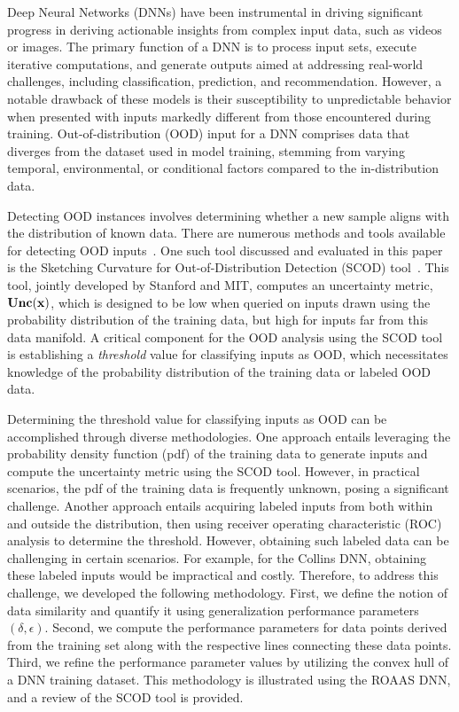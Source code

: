 \newtheorem{definition}{Definition}
Deep Neural Networks (DNNs) have been instrumental in driving significant progress in deriving actionable insights from complex input data, such as videos or images. The primary function of a DNN is to process input sets, execute iterative computations, and generate outputs aimed at addressing real-world challenges, including classification, prediction, and recommendation. However, a notable drawback of these models is their susceptibility to unpredictable behavior when presented with inputs markedly different from those encountered during training. Out-of-distribution (OOD) input for a DNN comprises data that diverges from the dataset used in model training, stemming from varying temporal, environmental, or conditional factors compared to the in-distribution data.

Detecting OOD instances involves determining whether a new sample
aligns with the distribution of known data. 
There are numerous methods and tools available for detecting OOD inputs~\cite{hendrycks2016baseline,ritter2018scalable,abdelzad2019detecting,madras2019detecting}. One such tool discussed and evaluated in this paper is the Sketching Curvature for Out-of-Distribution Detection (SCOD) tool~\cite{sharma2021sketching}. This tool, jointly developed by Stanford and MIT, computes an uncertainty metric, $\bf{Unc}(x)$, which is designed to be low when queried on inputs drawn using the probability distribution of the training data, but high for inputs far from this data manifold. A critical component for the OOD analysis using the SCOD tool is establishing a \emph{threshold} value for classifying inputs as OOD, which necessitates knowledge of the probability distribution of the training data or labeled OOD data.  

Determining the threshold value for classifying inputs as OOD can be accomplished through diverse methodologies. One approach entails leveraging the probability density function (pdf) of the training data to generate inputs and compute the uncertainty metric using the SCOD tool. However, in practical scenarios, the pdf of the training data is frequently unknown, posing a significant challenge. Another approach entails acquiring labeled inputs from both within and outside the distribution, then using receiver operating characteristic (ROC) analysis to determine the threshold. However, obtaining such labeled data can be challenging in certain scenarios. For example, for the Collins DNN, obtaining these labeled inputs would be impractical and costly. Therefore, to address this challenge, we developed the following methodology. First, we define the notion of data similarity and quantify it using generalization performance parameters $(\delta,\epsilon)$. Second, we compute the performance parameters for data points derived from the training set along with the respective lines connecting these data points. Third, we refine the performance parameter values by utilizing the convex hull of a DNN training dataset. This methodology is illustrated using the ROAAS DNN, and a review of the SCOD tool is provided.

